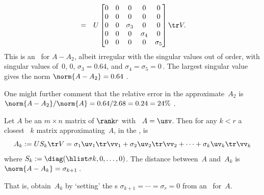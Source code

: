 \begin{example}
\begin{solution}
\begin{itemize}
\begin{eqnarray*}
\\&=&U\begin{bmatrix} 0&0&0&0&0
\\0&0&0&0&0
\\0&0&\sigma_3&0&0
\\0&0&0&\sigma_4&0
\\0&0&0&0&\sigma_5 \end{bmatrix}\tr V.
\end{eqnarray*}
This is an \svd\ for \(A-A_2\), albeit irregular with the singular values out of order, with singular values of~\(0\), \(0\), \(\sigma_3=0.64\), and \(\sigma_4=\sigma_5=0\)\,.
The largest singular value gives the norm \(\norm{A-A_2}=0.64\) \twodp.

One might further comment that the relative error in the approximate~\(A_2\) is \(\norm{A-A_2}/\norm{A}=0.64/2.68=0.24=24\%\) \twodp.
\end{itemize}
\end{solution}
\end{example}








\begin{theorem} \label{thm:am}
Let \(A\) be an \(m\times n\) matrix of \(\rank r\) with \svd\ \(A=\usv\).  
Then for any \(k< r\) a closest ~\(k\) matrix approximating~\(A\), in the , is
\begin{equation}
A_k:=US_k\tr V =\sigma_1\uv_1\tr\vv_1 +\sigma_2\uv_2\tr\vv_2+\cdots +\sigma_k\uv_k\tr\vv_k
\label{eq:rankkA}
\end{equation}
where \(S_k:=\diag(\hlist\sigma k,0,\ldots,0)\).
The distance between~\(A\) and~\(A_k\) is \(\norm{A-A_k}=\sigma_{k+1}\)\,.
\end{theorem}

That is, obtain~\(A_k\) by `setting' the s \(\sigma_{k+1}=\cdots=\sigma_r=0\) from an \svd\ for~\(A\).

